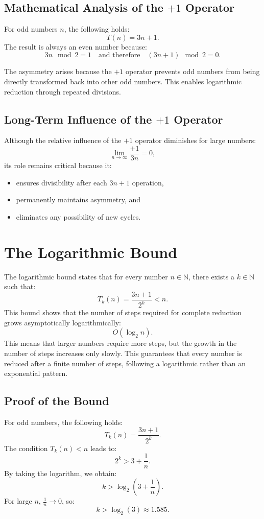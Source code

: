 \documentclass[a4paper,12pt]{article}
\begin{document}
\subsection{Mathematical Analysis of the \(+1\) Operator}
For odd numbers \( n \), the following holds:
\[
T(n) = 3n + 1.
\]
The result is always an even number because:
\[
3n \mod 2 = 1 \quad \text{and therefore} \quad (3n + 1) \mod 2 = 0.
\]

The asymmetry arises because the \(+1\) operator prevents odd numbers from being directly transformed back into other odd numbers. This enables logarithmic reduction through repeated divisions.

\subsection{Long-Term Influence of the \(+1\) Operator}
Although the relative influence of the \(+1\) operator diminishes for large numbers:
\[
\lim_{n \to \infty} \frac{+1}{3n} = 0,
\]
its role remains critical because it:
\begin{itemize}
    \item ensures divisibility after each \( 3n+1 \) operation,
    \item permanently maintains asymmetry, and
    \item eliminates any possibility of new cycles.
\end{itemize}

\section{The Logarithmic Bound}
The logarithmic bound states that for every number \( n \in \mathbb{N} \), there exists a \( k \in \mathbb{N} \) such that:
\[
T_k(n) = \frac{3n + 1}{2^k} < n.
\]
This bound shows that the number of steps required for complete reduction grows asymptotically logarithmically:
\[
O(\log_2 n).
\]
This means that larger numbers require more steps, but the growth in the number of steps increases only slowly.  
This guarantees that every number is reduced after a finite number of steps, following a logarithmic rather than an exponential pattern.


\subsection{Proof of the Bound}
For odd numbers, the following holds:
\[
T_k(n) = \frac{3n + 1}{2^k}.
\]
The condition \( T_k(n) < n \) leads to:
\[
2^k > 3 + \frac{1}{n}.
\]
By taking the logarithm, we obtain:
\[
k > \log_2(3 + \frac{1}{n}).
\]
For large \( n \), \( \frac{1}{n} \to 0 \), so:
\[
k > \log_2(3) \approx 1.585.
\]
\end{document}
